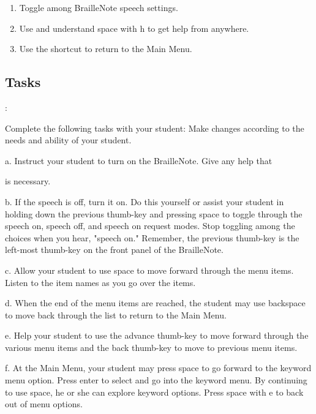\documentclass[10pt,letterpaper,twoside]{report}
\begin{document}
{{{{\begin{enumerate}
	\item Toggle among BrailleNote speech settings.
	      
	\item Use and understand space with h to get help from anywhere.
	      
	\item Use the shortcut to return to the Main Menu.
\end{enumerate}



 \subsection{Tasks}:



Complete the following tasks with your student: Make changes according to the needs and ability of your student.



a. Instruct your student to turn on the BrailleNote. Give any help that

is necessary.



b. If the speech is off, turn it on.  Do this yourself or assist your student in holding down the previous thumb-key and pressing space to toggle through the speech on, speech off, and speech on request modes.  Stop toggling among the choices when you hear, "speech on." Remember, the previous thumb-key is the left-most thumb-key on the front panel of the BrailleNote.



c. Allow your student to use space to move forward through the menu items.  Listen to the item names as you go over the items.



d. When the end of the menu items are reached, the student may use backspace to move back through the list to return to the Main Menu.



e. Help your student to use the advance thumb-key to move forward through the various menu items and the back thumb-key to move to previous menu items.



f. At the Main Menu, your student may press space to go forward to the keyword menu option.  Press enter to select and go into the keyword menu.  By continuing to use space, he or she can explore keyword options.  Press space with e to back out of menu options.



}}}}
\end{document}
